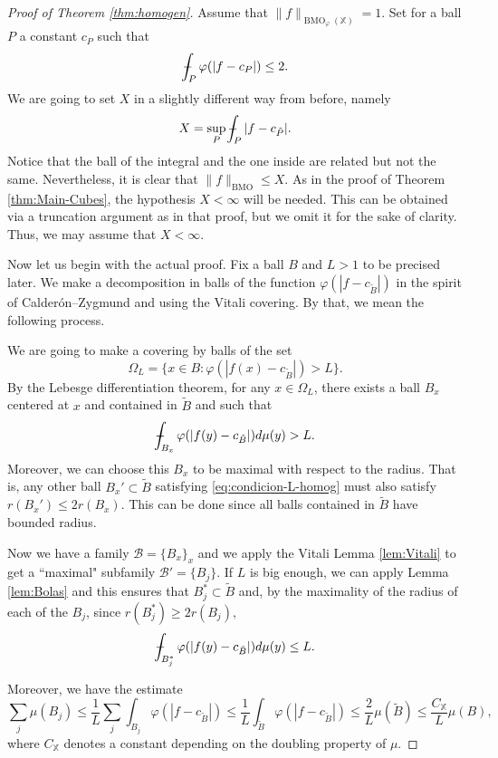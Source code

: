 \documentclass[11pt,a4paper]{amsart}
\theoremstyle{definition}
\theoremstyle{remark}
\numberwithin{equation}{section}
\DeclareMathOperator{\BMO}{BMO}
\def\Xint#1{\mathchoice
  {\XXint\displaystyle\textstyle{#1}}%
  {\XXint\textstyle\scriptstyle{#1}}%
  {\XXint\scriptstyle\scriptscriptstyle{#1}}%
  {\XXint\scriptscriptstyle\scriptscriptstyle{#1}}%
  \!\int}
\def\XXint#1#2#3{{\setbox0=\hbox{$#1{#2#3}{\int}$}
    \vcenter{\hbox{$#2#3$}}\kern-.5\wd0}}
\def\avgint{\Xint-}
\numberwithin{equation}{section}
\begin{document}
\begin{proof}[Proof of Theorem \ref{thm:homogen}]
Assume that $\|f\|_{\BMO_\varphi(\mathbb X)}=1$. Set for a ball $P$ a constant $c_P$ such that 
%
\[ \avgint_P \varphi(|f-c_P|) \leq 2. \]
%
We are going to set $X$ in  a slightly different way from before, namely
%
\[
X = \sup_P \avgint_P  |f-c_{\tilde P}|.
\]
Notice that the ball of the integral and the one inside are related but not the same. Nevertheless, it is clear that $ \|f\|_{\BMO} \leq X$.
As in the proof of Theorem \ref{thm:Main-Cubes}, the hypothesis $X<\infty$ will be needed. This can be obtained via a truncation argument as in that proof, but we omit it for the sake of clarity. Thus, we may assume that $X<\infty$.

Now let us begin with the actual proof. Fix a ball $B$ and $L>1$ to be precised later. We make a decomposition in balls of the function $\varphi(|f-c_{\tilde B}|)$ in the spirit of Calder\'on--Zygmund and using the Vitali covering. By that, we mean the following process. 

We are going to make a covering by balls of the set 
%
\[\Omega_L = \{ x\in B: \varphi(|f(x)-c_{\tilde B}|)>L\} .\]
%
By the Lebesge differentiation theorem, for any $x\in \Omega_L$, there exists a ball $B_x$ centered at $x$ and contained in $\tilde B$ and such that
%
\begin{equation}\label{eq:condicion-L-homog}
\avgint_{B_x} \varphi(|f(y)-c_{\tilde B}|) d\mu(y) >L.
\end{equation}
%
Moreover, we can choose this $B_x$ to be maximal with respect to the radius. That is, any other ball $B_x'\subset \tilde B$ satisfying \eqref{eq:condicion-L-homog} must also satisfy $r(B_x')\leq 2r(B_x)$. This can be done since all balls contained in $\tilde B$ have bounded radius.
%


Now we have a family $\mathcal B = \{ B_x\}_x$ and we apply the Vitali Lemma \ref{lem:Vitali} to get a ``maximal" subfamily $\mathcal B' = \lbrace B_j\rbrace$. If $L$ is big enough, we can apply Lemma \ref{lem:Bolas} and this ensures that $B_j^* \subset \tilde B$ and, by the maximality of the radius of each of the $B_j$, since $r(B_j^*) \geq 2r(B_j),$ 
%
\[
\avgint_{B_j^*} \varphi(|f(y)-c_{\tilde B}|) d\mu(y) \leq L.
\]
%

Moreover, we have the estimate
%
\[
\sum_j \mu(B_j) \leq \frac 1L \sum_j \int_{B_j} \varphi(|f-c_{\tilde{B}}|) \leq \frac 1 L \int_{\tilde B} \varphi(|f-c_{\tilde B}|) \leq \frac 2{L} \mu(\tilde B) \leq \frac{C_{\mathbb X}}L \mu(B),
\]
%
where $C_\mathbb{X}$ denotes a constant depending on the doubling property of $\mu$.


\end{proof}
\end{document}

